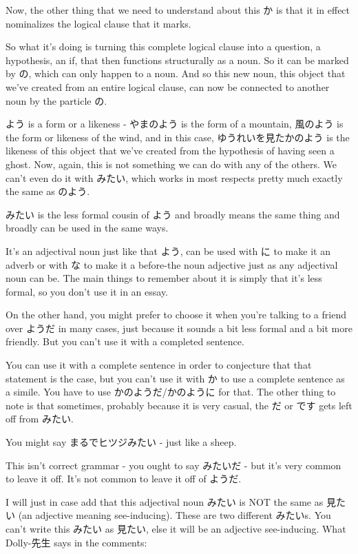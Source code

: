 Now, the other thing that we need to understand about this か is that it in effect nominalizes the logical clause that it marks.

{}

So what it's doing is turning this complete logical clause into a question, a hypothesis, an if, that then functions structurally as a noun. So it can be marked by の, which can only happen to a noun. And so this new noun, this object that we've created from an entire logical clause, can now be connected to another noun by the particle の.

よう is a form or a likeness - やまのよう is the form of a mountain, 風のよう is the form or likeness of the wind, and in this case, ゆうれいを見たかのよう is the likeness of this object that we've created from the hypothesis of having seen a ghost. Now, again, this is not something we can do with any of the others. We can't even do it with みたい, which works in most respects pretty much exactly the same as のよう.

\stopsectionlevel

\startsectionlevel[title={みたい},reference={みたい}]

みたい is the less formal cousin of よう and broadly means the same thing and broadly can be used in the same ways.

{}

It's an adjectival noun just like that よう, can be used with に to make it an adverb or with な to make it a before-the noun adjective just as any adjectival noun can be. The main things to remember about it is simply that it's less formal, so you don't use it in an essay.

On the other hand, you might prefer to choose it when you're talking to a friend over ようだ in many cases, just because it sounds a bit less formal and a bit more friendly. But you can't use it with a completed sentence.

You can use it with a complete sentence in order to conjecture that that statement is the case, but you can't use it with か to use a complete sentence as a simile. You have to use かのようだ/かのように for that. The other thing to note is that sometimes, probably because it is very casual, the だ or です gets left off from みたい.

You might say まるでヒツジみたい - just like a sheep.

{}

This isn't correct grammar - you ought to say みたいだ - but it's very common to leave it off. It's not common to leave it off of ようだ.

I will just in case add that this adjectival noun みたい is NOT the same as 見たい (an adjective meaning see-inducing). These are two different みたいs. You can't write this みたい as 見たい, else it will be an adjective see-inducing. What Dolly-先生 says in the comments:

{}

{}

\stopsectionlevel

\stopsectionlevel
